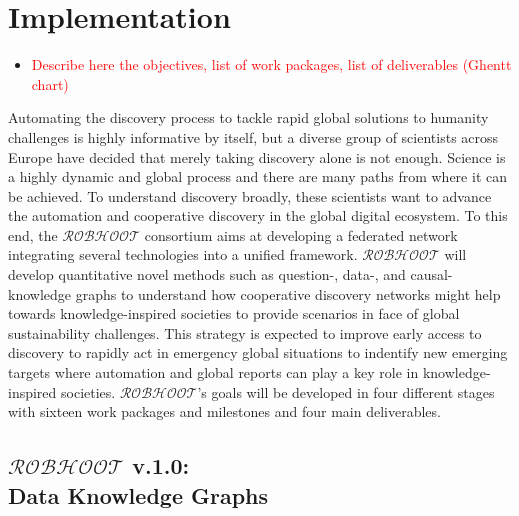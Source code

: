\documentclass[11pt, a4paper]{article} %
\begin{document}
\section{Implementation}

\begin{itemize}
\item \textcolor{red}{Describe here the objectives, list of work
    packages, list of deliverables (Ghentt chart)}
\end{itemize}
    
Automating the discovery process to tackle rapid global solutions to
humanity challenges is highly informative by itself, but a diverse
group of scientists across Europe have decided that merely taking
discovery alone is not enough. Science is a highly dynamic and global
process and there are many paths from where it can be achieved. To
understand discovery broadly, these scientists want to advance the
automation and cooperative discovery in the global digital
ecosystem. To this end, the $\mathcal{ROBHOOT}$ consortium aims at
developing a federated network integrating several technologies into a
unified framework. $\mathcal{ROBHOOT}$ will develop quantitative novel
methods such as question-, data-, and causal-knowledge graphs to
understand how cooperative discovery networks might help towards
knowledge-inspired societies to provide scenarios in face of global
sustainability challenges. This strategy is expected to improve early
access to discovery to rapidly act in emergency global situations to
indentify new emerging targets where automation and global reports can
play a key role in knowledge-inspired societies. $\mathcal{ROBHOOT}$'s
goals will be developed in four different stages with sixteen work
packages and milestones and four main deliverables.

\subsection{{\bf $\mathcal{ROBHOOT}$ v.1.0}: \\ Data Knowledge Graphs}
\end{document}
